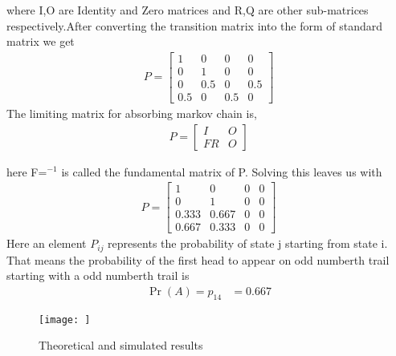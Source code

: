 \documentclass[journal,12pt,twocolumn]{IEEEtran}
\begin{document}
where I,O are Identity and Zero matrices and R,Q are other sub-matrices respectively.After converting the transition matrix into the form of standard matrix we get
\begin{align} P = 
\begin{bmatrix}
1 & 0 & 0 & 0 \\
0 & 1 & 0 & 0 \\
0 & 0.5 & 0 & 0.5 \\
0.5 & 0 & 0.5 & 0 
\end{bmatrix}
\end{align}
The limiting matrix for absorbing markov chain is,
\begin{align}P = 
\begin{bmatrix}
I & O \\
FR & O
\end{bmatrix}
\end{align}

here F=$^{-1}$ is called the fundamental matrix of P. Solving this leaves us with 
\begin{align}
P = 
\begin{bmatrix}
1 & 0 & 0 & 0 \\
0 & 1 & 0 & 0 \\
0.333 & 0.667 & 0 & 0 \\
0.667 & 0.333 & 0 & 0
\end{bmatrix}
\end{align}
Here an element $P_{ij}$ represents the probability of state j starting from state i. That means the probability of the first head to appear on odd numberth trail starting with a odd numberth trail is  
\begin{align}
   \Pr(A) = p_{14} 
   & = 0.667
\end{align}

\begin{figure} [H]
    \texttt{[image: ]}
    \caption{Theoretical and simulated results}
    \label{Fig 1}
    \centering
{}
\end{figure}
\end{document}
